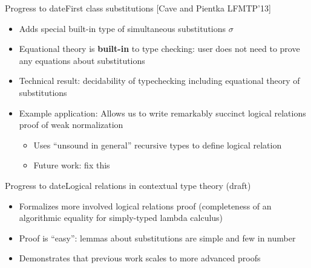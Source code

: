 \documentclass[usenames,dvipsnames]{beamer}
\begin{document}
\begin{frame}{Progress to date}{First class substitutions [Cave and Pientka LFMTP'13]}
\begin{itemize}
\item Adds special built-in type of simultaneous substitutions $\sigma$
\item Equational theory is \textbf{built-in} to type checking: user does not need to prove any equations about substitutions
\item Technical result: decidability of typechecking including equational theory of substitutions
\item Example application: Allows us to write remarkably succinct logical relations proof of weak normalization
\begin{itemize}
\item Uses ``unsound in general'' recursive types to define logical relation
\item Future work: fix this
\end{itemize}
\end{itemize}
\end{frame}

\begin{frame}{Progress to date}{Logical relations in contextual type theory (draft)}
\begin{itemize}
\item Formalizes more involved logical relations proof (completeness of an algorithmic equality for simply-typed lambda calculus)
\item Proof is ``easy'': lemmas about substitutions are simple and few in number
\item Demonstrates that previous work scales to more advanced proofs
\end{itemize}
\end{frame}
\end{document}
